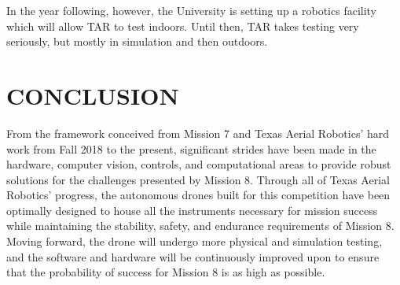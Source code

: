 \documentclass[12pt,letterpaper]{article}
\begin{document}
	In the year following, however, the University is setting up a robotics facility which will allow TAR to test indoors. Until then, TAR takes testing very seriously, but mostly in simulation and then outdoors.


\section*{CONCLUSION}
	From the framework conceived from Mission 7 and Texas Aerial Robotics’ hard work from Fall 2018 to the present, significant strides have been made in the hardware, computer vision, controls, and computational areas to provide robust solutions for the challenges presented by Mission 8. Through all of Texas Aerial Robotics’ progress, the autonomous drones built for this competition have been optimally designed to house all the instruments necessary for mission success while maintaining the stability, safety, and endurance requirements of Mission 8. Moving forward, the drone will undergo more physical and simulation testing, and the software and hardware will be continuously improved upon to ensure that the probability of success for Mission 8 is as high as possible.
	\nocite{ORBSLAM2}
	\nocite{daoud2018slamm}
	
	
\end{document}
